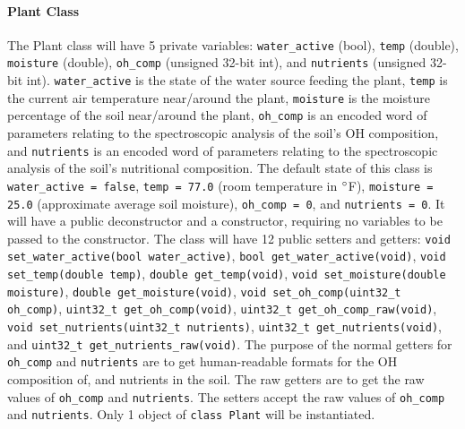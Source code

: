 \paragraph{Plant Class}
The Plant class will have 5 private variables: \texttt{water\_active} (bool),
\texttt{temp} (double), \texttt{moisture} (double), \texttt{oh\_comp}
(unsigned 32-bit int), and \texttt{nutrients} (unsigned 32-bit int).
\texttt{water\_active} is the state of the water source feeding the plant,
\texttt{temp} is the current air temperature near/around the plant,
\texttt{moisture} is the moisture percentage of the soil near/around the plant,
\texttt{oh\_comp} is an encoded word of parameters relating to the
spectroscopic analysis of the soil's OH composition, and
\texttt{nutrients} is an encoded word of parameters relating to the
spectroscopic analysis of the soil's nutritional composition. The
default state of this class is \texttt{water\_active = false},
\texttt{temp = 77.0} (room temperature in $\degree$F), \texttt{moisture = 25.0}
(approximate average soil moisture), \texttt{oh\_comp = 0}, and
\texttt{nutrients = 0}. It will have a public deconstructor and a constructor,
requiring no variables to be passed to the constructor. The class will have 12
public setters and getters:
\texttt{void set\_water\_active(bool water\_active)}, 
\texttt{bool get\_water\_active(void)}, 
\texttt{void set\_temp(double temp)}, \texttt{double get\_temp(void)}, 
\texttt{void set\_moisture(double moisture)}, 
\texttt{double get\_moisture(void)}, 
\texttt{void set\_oh\_comp(uint32\_t oh\_comp)}, 
\texttt{uint32\_t get\_oh\_comp(void)},
\texttt{uint32\_t get\_oh\_comp\_raw(void)}, 
\texttt{void set\_nutrients(uint32\_t nutrients)}, 
\texttt{uint32\_t get\_nutrients(void)}, and
\texttt{uint32\_t get\_nutrients\_raw(void)}. The purpose of the normal getters
for \texttt{oh\_comp} and \texttt{nutrients} are to get human-readable formats
for the OH composition of, and nutrients in the soil. The raw getters are to
get the raw values of \texttt{oh\_comp} and \texttt{nutrients}. The setters
accept the raw values of \texttt{oh\_comp} and \texttt{nutrients}. Only 
1 object of \texttt{class Plant} will be instantiated.

